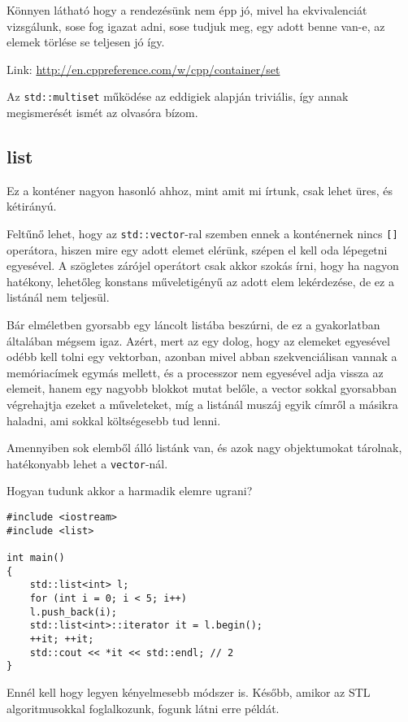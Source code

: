 \documentclass[a4paper,11.5pt]{article}
\begin{document}
	Könnyen látható hogy a rendezésünk nem épp jó, mivel ha ekvivalenciát vizsgálunk, sose fog igazat adni, sose tudjuk meg, egy adott benne van-e, az elemek törlése se teljesen jó így.
	
	Link: \url{http://en.cppreference.com/w/cpp/container/set}
	
	\begin{note}
		Az \texttt{std::multiset} működése az eddigiek alapján triviális, így annak megismerését ismét az olvasóra bízom.
	\end{note}
	\subsection{list}
	Ez a konténer nagyon hasonló ahhoz, mint amit mi írtunk, csak lehet üres, és kétirányú.
	\smallskip
	
	Feltűnő lehet, hogy az \texttt{std::vector}-ral szemben ennek a konténernek nincs \texttt{[]} operátora, hiszen mire egy adott elemet elérünk, szépen el kell oda lépegetni egyesével. A szögletes zárójel operátort csak akkor szokás írni, hogy ha nagyon hatékony, lehetőleg konstans műveletigényű az adott elem lekérdezése, de ez a listánál nem teljesül.
	\begin{note}
		Bár elméletben gyorsabb egy láncolt listába beszúrni, de ez a gyakorlatban általában mégsem igaz. Azért, mert az egy dolog, hogy az elemeket egyesével odébb kell tolni egy vektorban, azonban mivel abban szekvenciálisan vannak a memóriacímek egymás mellett, és a processzor nem egyesével adja vissza az elemeit, hanem egy nagyobb blokkot mutat belőle, a vector sokkal gyorsabban végrehajtja ezeket a műveleteket, míg a listánál muszáj egyik címről a másikra haladni, ami sokkal költségesebb tud lenni.
	\end{note}
	\begin{note}
		Amennyiben sok elemből álló listánk van, és azok nagy objektumokat tárolnak, hatékonyabb lehet a \texttt{vector}-nál.
	\end{note}
	Hogyan tudunk akkor a harmadik elemre ugrani?
	\begin{lstlisting}
#include <iostream>
#include <list>

int main()
{
	std::list<int> l;
	for (int i = 0; i < 5; i++)
	l.push_back(i);
	std::list<int>::iterator it = l.begin();
	++it; ++it;
	std::cout << *it << std::endl; // 2
}
	\end{lstlisting}
	Ennél kell hogy legyen kényelmesebb módszer is. Később, amikor az STL algoritmusokkal foglalkozunk, fogunk látni erre példát.
	
\end{document}
